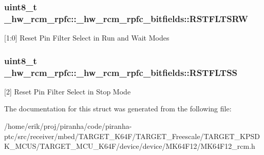 \subsubsection[{\texorpdfstring{R\+S\+T\+F\+L\+T\+S\+RW}{RSTFLTSRW}}]{\setlength{\rightskip}{0pt plus 5cm}uint8\+\_\+t \+\_\+hw\+\_\+rcm\+\_\+rpfc\+::\+\_\+hw\+\_\+rcm\+\_\+rpfc\+\_\+bitfields\+::\+R\+S\+T\+F\+L\+T\+S\+RW}\hypertarget{struct__hw__rcm__rpfc_1_1__hw__rcm__rpfc__bitfields_a3572a49431d60f650936690bc42cc8e0}{}\label{struct__hw__rcm__rpfc_1_1__hw__rcm__rpfc__bitfields_a3572a49431d60f650936690bc42cc8e0}
\mbox{[}1\+:0\mbox{]} Reset Pin Filter Select in Run and Wait Modes 
\subsubsection[{\texorpdfstring{R\+S\+T\+F\+L\+T\+SS}{RSTFLTSS}}]{\setlength{\rightskip}{0pt plus 5cm}uint8\+\_\+t \+\_\+hw\+\_\+rcm\+\_\+rpfc\+::\+\_\+hw\+\_\+rcm\+\_\+rpfc\+\_\+bitfields\+::\+R\+S\+T\+F\+L\+T\+SS}\hypertarget{struct__hw__rcm__rpfc_1_1__hw__rcm__rpfc__bitfields_ae9c6697d22eb6756e7bc29dcb765e156}{}\label{struct__hw__rcm__rpfc_1_1__hw__rcm__rpfc__bitfields_ae9c6697d22eb6756e7bc29dcb765e156}
\mbox{[}2\mbox{]} Reset Pin Filter Select in Stop Mode 

The documentation for this struct was generated from the following file\+:\begin{DoxyCompactItemize}
\item 
/home/erik/proj/piranha/code/piranha-\/ptc/src/receiver/mbed/\+T\+A\+R\+G\+E\+T\+\_\+\+K64\+F/\+T\+A\+R\+G\+E\+T\+\_\+\+Freescale/\+T\+A\+R\+G\+E\+T\+\_\+\+K\+P\+S\+D\+K\+\_\+\+M\+C\+U\+S/\+T\+A\+R\+G\+E\+T\+\_\+\+M\+C\+U\+\_\+\+K64\+F/device/device/\+M\+K64\+F12/M\+K64\+F12\+\_\+rcm.\+h\end{DoxyCompactItemize}
